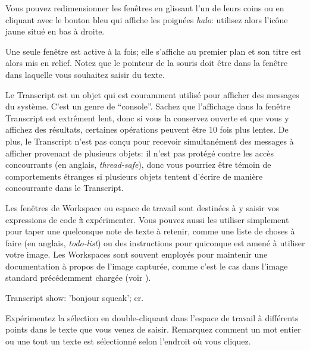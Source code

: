 \documentclass[a4paper,10pt,twoside]{book}
\begin{document}
Vous pouvez redimensionner les fenêtres en glissant l'un de leurs
coins ou en cliquant avec le bouton bleu qui affiche les poignées
\emph{halo}: utilisez alors l'icône jaune situé en bas à droite.

Une seule fenêtre est active à la fois; elle s'affiche au premier plan
et son titre est alors mis en relief. Notez que le pointeur de la
souris doit être dans la fenêtre dans laquelle vous souhaitez saisir du texte.

Le Transcript est un objet qui est couramment utilisé pour afficher
des messages du système. C'est un genre de ``console''.
Sachez que l'affichage dans la fenêtre Transcript est extr\^ement
lent, donc si vous la conservez ouverte et que vous y affichez des
résultats, certaines opérations peuvent \^etre 10 fois plus lentes.
De plus, le Transcript n'est pas conçu pour recevoir
simultanément des messages à afficher provenant de plusieurs objets:
il n'est pas prot\'eg\'e contre les acc\`es concourrants (en anglais,
\emph{thread-safe}), donc vous pourriez \^etre t\'emoin de
comportements \'etranges si plusieurs objets tentent d'\'ecrire de
mani\`ere concourrante dans le Transcript. 

Les fen\^etres de Workspace ou espace de travail sont destin\'ees \`a
y saisir vos expressions de code \st \`a exp\'erimenter.
Vous pouvez aussi les utiliser simplement pour taper une quelconque
note de texte \`a retenir, comme une liste de choses \`a faire (en
anglais, \emph{todo-list}) ou des instructions pour quiconque est
amen\'e \`a utiliser votre image.
Les Workspaces sont souvent employ\'es pour maintenir une
documentation \`a propos de l'image captur\'ee, comme c'est le cas
dans l'image standard pr\'ec\'edemment charg\'ee (voir
).

\begin{code}{}
Transcript show: 'bonjour squeak'; cr.
\end{code}

Exp\'erimentez la s\'election
en double-cliquant dans l'espace de travail \`a diff\'erents points dans
le texte que vous venez de saisir.
Remarquez comment un mot entier ou une tout un texte est
s\'electionn\'e selon l'endroit o\`u vous cliquez.
\end{document}
